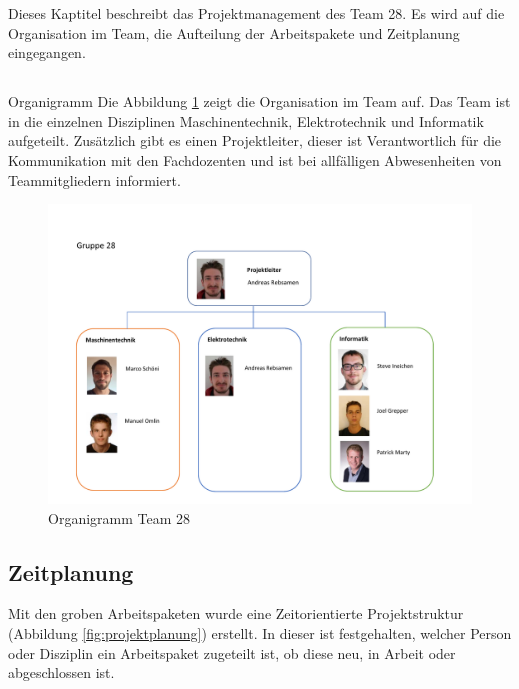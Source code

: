 \documentclass[../../main.tex]{subfiles}
\begin{document}
Dieses Kaptitel beschreibt das Projektmanagement des Team 28. Es wird auf die Organisation im Team, die Aufteilung der Arbeitspakete und Zeitplanung eingegangen.

\subsection{}{Organigramm}
Die Abbildung \ref{fig:organigramm} zeigt die Organisation im Team auf. Das Team ist in die einzelnen Disziplinen Maschinentechnik, Elektrotechnik und Informatik aufgeteilt. Zusätzlich gibt es einen Projektleiter, dieser ist Verantwortlich für die Kommunikation mit den Fachdozenten und ist bei allfälligen Abwesenheiten von Teammitgliedern informiert.


\begin{figure}[H] \centering
    \includegraphics[page=1,width=.9\textwidth, trim=1cm .5cm 1cm 3.2cm, clip]{Organigramm.pdf}
    \caption{Organigramm Team 28}
    \label{fig:organigramm}
\end{figure}
\pagebreak
\subsection{Zeitplanung}
Mit den groben Arbeitspaketen wurde eine Zeitorientierte Projektstruktur (Abbildung \ref{fig:projektplanung}) erstellt. In dieser ist festgehalten, welcher Person oder Disziplin ein Arbeitspaket zugeteilt ist, ob diese neu, in Arbeit oder abgeschlossen ist. \\
\end{document}
